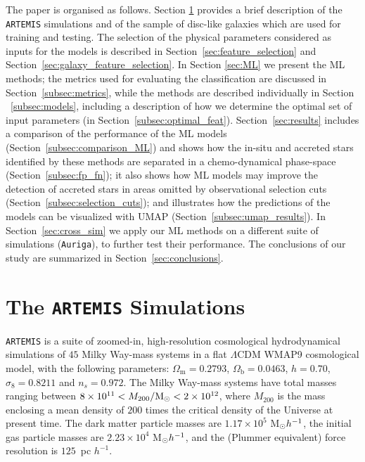 The paper is organised as follows. Section \ref{sec:data} provides a brief description of the \texttt{ARTEMIS} simulations and of the sample of disc-like galaxies which are used for training and testing. The selection of the physical parameters considered as inputs for the models is described in Section~\ref{sec:feature_selection} and Section~\ref{sec:galaxy_feature_selection}. In Section \ref{sec:ML} we present the ML methods; the metrics used for evaluating the classification are discussed in Section~\ref{subsec:metrics}, while the methods are described individually in Section ~\ref{subsec:models}, including a description of how we determine the optimal set of input parameters (in Section~\ref{subsec:optimal_feat}). Section~\ref{sec:results} includes a comparison of the performance of the ML models (Section~\ref{subsec:comparison_ML}) and shows how the in-situ and accreted stars identified by these methods are separated in a chemo-dynamical phase-space (Section~\ref{subsec:fp_fn}); it also shows how ML models may improve the detection of accreted stars in areas omitted by observational selection cuts  (Section~\ref{subsec:selection_cuts}); and illustrates how the predictions of the models can be visualized with UMAP (Section~\ref{subsec:umap_results}). In Section~\ref{sec:cross_sim} we apply our ML methods on a different suite of simulations (\texttt{Auriga}), to further test their performance. The conclusions of our study are summarized in Section~\ref{sec:conclusions}.

\section{The \texttt{ARTEMIS} Simulations}
\label{sec:data}

\texttt{ARTEMIS} is a suite of zoomed-in, high-resolution cosmological hydrodynamical simulations of $45$ Milky Way-mass systems \citep{Font2020,Font2021} in a flat $\Lambda$CDM WMAP9 \citep{Hinshaw2013} cosmological model, with the following parameters: $\Omega_\textrm{m}=0.2793$, $\Omega_\textrm{b}=0.0463$, $h=0.70$, $\sigma_8=0.8211$ and $n_s=0.972$. The Milky Way-mass systems have total masses ranging between $8 \times 10^{11} < {M}_{200}/{\rm M}_{\odot} < 2 \times 10^{12}$, where ${M}_{200}$ is the mass enclosing a mean density of $200$ times the critical density of the Universe at present time. The dark matter particle masses are $1.17\times10^5$ M$_{\odot}\/h^{-1}$, the initial gas particle masses are $2.23\times10^4$ M$_{\odot}\/h^{-1}$, and the (Plummer equivalent) force resolution is $125$~pc $h^{-1}$.

